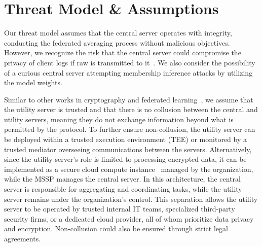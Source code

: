 
\section{Threat Model \& Assumptions}


Our threat model assumes that the central server operates with integrity, conducting the federated averaging process without malicious objectives. However, we recognize the risk that the central server could compromise the privacy of client logs if raw \logs is transmitted to it~\cite{man2021intelligent,li2023efficient}. We also consider the possibility of a curious central server attempting membership inference attacks by utilizing the model weights.

Similar to other works in cryptography and federated learning~\cite{roy2020crypte,wu2022federated}, we assume that the utility server is trusted and that there is no collusion between the central and utility servers, meaning they do not exchange information beyond what is permitted by the protocol. To further ensure non-collusion, the utility server can be deployed within a trusted execution environment (TEE)\cite{mckeen2016intel} or monitored by a trusted mediator overseeing communications between the servers\cite{alwen2009collusion}. Alternatively, since the utility server's role is limited to processing encrypted data, it can be implemented as a secure cloud compute instance~\cite{cloudinstance} managed by the organization, while the MSSP manages the central server. In this architecture, the central server is responsible for aggregating and coordinating tasks, while the utility server remains under the organization's control. This separation allows the utility server to be operated by trusted internal IT teams, specialized third-party security firms, or a dedicated cloud provider, all of whom prioritize data privacy and encryption. Non-collusion could also be ensured through strict legal agreements.

